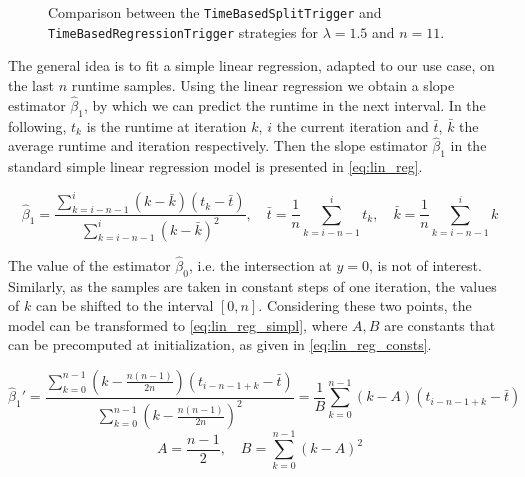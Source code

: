 \begin{figure}[htpb]
\begin{subfigure}{0.5\textwidth}
	\end{subfigure}
	\caption{Comparison between the \texttt{TimeBasedSplitTrigger} and \texttt{TimeBasedRegressionTrigger} strategies for $\lambda=1.5$ and $n=11$.}
	\label{fig:split_vs_regression}
\end{figure}



The general idea is to fit a simple linear regression, adapted to our use case, on the last $n$ runtime samples. Using the linear regression we obtain a slope estimator $\hat{\beta}_1$, by which we can predict the runtime in the next interval. In the following, $t_k$ is the runtime at iteration $k$, $i$ the current iteration and $\bar t$, $\bar k$ the average runtime and iteration respectively. Then the slope estimator $\hat{\beta}_1$ in the standard simple linear regression model is presented in \eqref{eq:lin_reg}.


\begin{equation}
	\hat{\beta}_1=\frac{\sum_{k=i-n-1}^{i}(k-\bar k)(t_k-\bar t)}{\sum_{k=i-n-1}^{i}(k-\bar k)^2},\quad\bar t=\frac{1}{n}\sum_{k=i-n-1}^it_k, \quad \bar k = \frac{1}{n}\sum_{k=i-n-1}^ik\label{eq:lin_reg}
\end{equation}

The value of the estimator $\hat\beta_0$, i.e. the intersection at $y=0$, is not of interest. Similarly, as the samples are taken in constant steps of one iteration, the values of $k$ can be shifted to the interval $[0, n]$. Considering these two points, the model can be transformed to \eqref{eq:lin_reg_simpl}, where $A, B$ are constants that can be precomputed at initialization, as given in \eqref{eq:lin_reg_consts}.

\begin{equation}
	\hat{\beta}_1' =\frac{\sum_{k=0}^{n-1}\left(k-\frac{n(n-1)}{2n}\right)(t_{i-n-1+k}-\bar t)}{\sum_{k=0}^{n-1}\left(k-\frac{n(n-1)}{2n}\right)^2}= \frac{1}{B}\sum_{k=0}^{n-1}\left(k-A\right)(t_{i-n-1+k}-\bar t)\label{eq:lin_reg_simpl}
\end{equation}
\begin{equation}
	A = \frac{n-1}{2}, \quad B=\sum_{k=0}^{n-1}\left(k-A\right)^2\label{eq:lin_reg_consts}
\end{equation}

